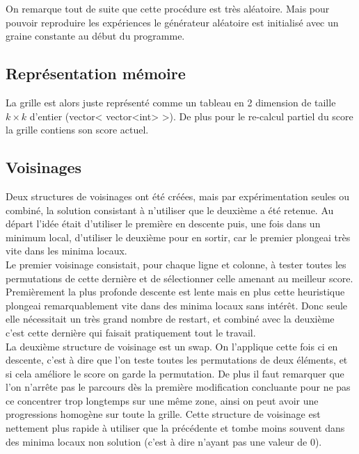 \documentclass[12pt,a4paper]{article}
\begin{document}
On remarque tout de suite que cette procédure est très aléatoire. Mais pour pouvoir reproduire les expériences le générateur aléatoire est initialisé avec un graine constante au début du programme.

\subsection{Représentation mémoire}

La grille est alors juste représenté comme un tableau en 2 dimension de taille $k \times k$ d'entier (vector< vector<int> >). De plus pour le re-calcul partiel du score la grille contiens son score actuel.

\subsection{Voisinages}

Deux structures de voisinages ont été créées, mais par expérimentation seules ou combiné, la solution consistant à n'utiliser que le deuxième a été retenue. Au départ l’idée était d'utiliser le première en descente puis, une fois dans un minimum local, d'utiliser le deuxième pour en sortir, car le premier plongeai très vite dans les minima locaux.\\

Le premier voisinage consistait, pour chaque ligne et colonne, à tester toutes les permutations de cette dernière et de sélectionner celle amenant au meilleur score.
Premièrement la plus profonde descente est lente mais en plus cette heuristique plongeai remarquablement vite dans des minima locaux sans intérêt. Donc seule elle nécessitait un très grand nombre de restart, et combiné avec la deuxième c'est cette dernière qui faisait pratiquement tout le travail.\\

La deuxième structure de voisinage est un swap. On l'applique cette fois ci en descente, c'est à dire que l'on teste toutes les permutations de deux éléments, et si cela améliore le score on garde la permutation. De plus il faut remarquer que l'on n’arrête pas le parcours dès la première modification concluante pour ne pas ce concentrer trop longtemps sur une même zone, ainsi on peut avoir une progressions homogène sur toute la grille. Cette structure de voisinage est nettement plus rapide à utiliser que la précédente et tombe moins souvent dans des minima locaux non solution (c'est à dire n'ayant pas une valeur de 0).\\
\end{document}
